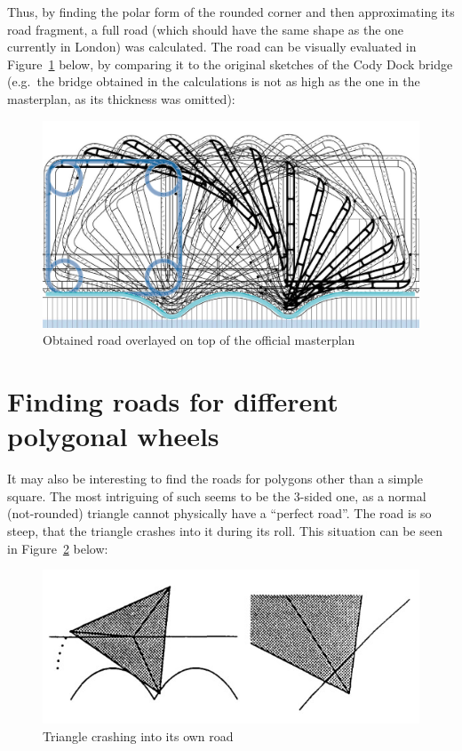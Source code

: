 \documentclass[12pt]{article}
\begin{document}
        Thus, by finding the polar form of the rounded corner and then approximating its road fragment, a full road (which should have the same shape as the one currently in London) was calculated. The road can be visually evaluated in Figure~\ref{fig:masterplan_overlayed} below, by comparing it to the original sketches of the Cody Dock bridge (e.g.\ the bridge obtained in the calculations is not as high as the one in the masterplan, as its thickness was omitted):

        \begin{figure}[H]
            \centering
            \includegraphics[width=0.8\linewidth]{images/masterplan_overlayed.png}
            \caption[Obtained road overlayed on top of the official masterplan]{Obtained road overlayed on top of the official masterplan~\cite{bridge_masterplan}}\label{fig:masterplan_overlayed}
        \end{figure}

    \section{Finding roads for different polygonal wheels}

        It may also be interesting to find the roads for polygons other than a simple square. The most intriguing of such seems to be the 3-sided one, as a normal (not-rounded) triangle cannot physically have a ``perfect road''. The road is so steep, that the triangle crashes into it during its roll. This situation can be seen in Figure~\ref{fig:triangle_crash} below:
        \begin{figure}[H]
            \centering
            \includegraphics[width=0.7\linewidth]{images/triangle_wheel.jpg}
            \caption{Triangle crashing into its own road~\cite{Hall_Wagon_1992}}\label{fig:triangle_crash}
        \end{figure}
\end{document}

